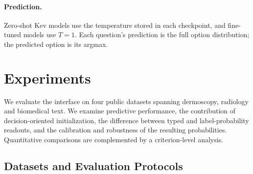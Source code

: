 \documentclass{article}
\begin{document}
\paragraph{Prediction.} Zero-shot Kev models use the temperature stored in each checkpoint, and fine-tuned models use $T=1$. Each question's prediction is the full option distribution; the predicted option is its argmax.

\section{Experiments}
We evaluate the interface on four public datasets spanning dermoscopy, radiology and biomedical text. We examine predictive performance, the contribution of decision-oriented initialization, the difference between typed and label-probability readouts, and the calibration and robustness of the resulting probabilities. Quantitative comparisons are complemented by a criterion-level analysis.

\subsection{Datasets and Evaluation Protocols}
\begin{table}[t]
\centering
\caption{Datasets and official splits. Counts are lesions for Derm7pt and yes/no questions (images) for SLAKE and VQA-RAD. Overlap is the share of test questions whose image file also occurs among the yes/no training questions (MD5 match).}
\label{tab:data}
\small
{}
\end{table}
\end{document}
